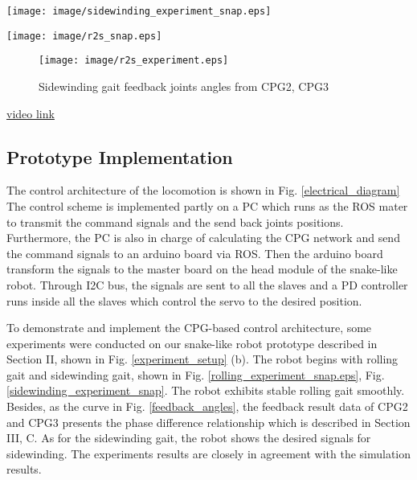 \documentclass[letterpaper, 10 pt, conference]{ieeeconf}
\begin{document}
\begin{figure*}[thpb]
\centering
\texttt{[image: image/sidewinding\_experiment\_snap.eps]}
\caption{Snapshots of the robot rolling, the CPG parameters: amplitude $\pm30^{\circ}$, frequency $3Hz$, phase difference $pi/2$. See also the link below.}
\label{sidewinding_experiment_snap}
\end{figure*}

\begin{figure*}[thpb]
\centering
\texttt{[image: image/r2s\_snap.eps]}
\caption{Snapshots of the robot rolling, the CPG parameters: amplitude $\pm30^{\circ}$, frequency $3Hz$, phase difference $pi/2$. See also the link below.}
\label{r2s_snap}
\end{figure*}

\begin{figure}[thpb]
\centering
    \texttt{[image: image/r2s\_experiment.eps]}
    \caption{Sidewinding gait feedback joints angles from CPG2, CPG3}
    \label{r2s_experiment}
\end{figure}

\href{https://www.youtube.com/channel/UCC-bpOlhM7zSwDCZjVuE2rQ/videos?view=0&shelf_id=0&sort=dd}{video link}

\subsection{Prototype Implementation}

The control architecture of the locomotion is shown in Fig. \ref{electrical_diagram} The control scheme is implemented partly on a PC which runs as the ROS mater to transmit the command signals and the send back joints positions. Furthermore, the PC is also in charge of calculating the CPG network and send the command signals to an arduino board via ROS. Then the arduino board transform the signals to the master board on the head module of the snake-like robot. Through I2C bus, the signals are sent to all the slaves and a PD controller runs inside all the slaves which control the servo to the desired position.

To demonstrate and implement the CPG-based control architecture, some experiments were conducted on our snake-like robot prototype described in Section II, shown in Fig. \ref{experiment_setup} (b). The robot begins with rolling gait and sidewinding gait, shown in Fig. \ref{rolling_experiment_snap.eps}, Fig. \ref{sidewinding_experiment_snap}. The robot exhibits stable rolling gait smoothly. Besides, as the curve in Fig. \ref{feedback_angles}, the feedback result data of CPG2 and CPG3 presents the phase difference relationship which is described in Section III, C.
As for the sidewinding gait, the robot shows the desired signals for sidewinding. The experiments results are closely in agreement with the simulation results.
\end{document}
